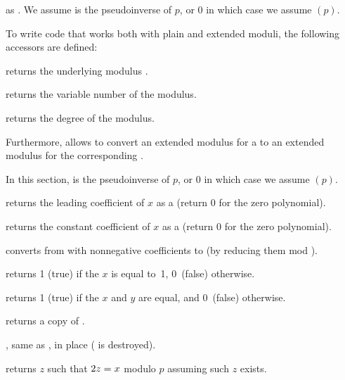  as .
We assume  is the pseudoinverse of $p$, or $0$ in which case we
assume $(p)$.

To write code that works both with plain and extended moduli, the following
accessors are defined:

 returns the underlying modulus .

 returns the variable number of the modulus.

 returns the degree of the modulus.

Furthermore,  allows to convert an extended modulus for
a  to an extended modulus for the corresponding .


In this section,  is the pseudoinverse of $p$, or $0$ in which case
we assume $(p)$.

 returns the leading coefficient of $x$ as a
 (return $0$ for the zero polynomial).

 returns the constant coefficient of $x$ as a
 (return $0$ for the zero polynomial).

 converts from  with
nonnegative coefficients to  (by reducing them mod ).

 returns 1 (true) if the  $x$ is equal
to~1, 0~(false) otherwise.

 returns 1 (true) if the  $x$
and $y$ are equal, and 0~(false) otherwise.

 returns a copy of .




, same as , in place
( is destroyed).



 returns $z$ such that $2\*z = x$ modulo
$p$ assuming such $z$ exists.

